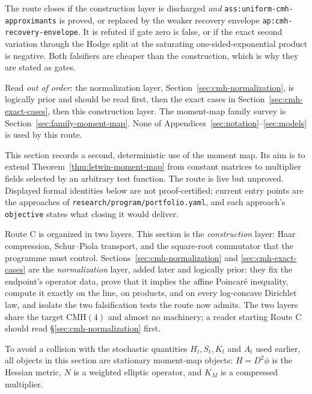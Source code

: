 \documentclass[../../main.tex]{subfiles}
\begin{document}
\begin{description}[leftmargin=0pt,style=nextline,itemsep=0.3em]
  \item[7. Completion or reopening criterion.] The route closes if the construction layer is
  discharged \emph{and} \texttt{ass:uniform-cmh-approximants} is proved, or replaced by the
  weaker recovery envelope \texttt{ap:cmh-recovery-envelope}. It is refuted if gate zero is
  false, or if the exact second variation through the Hodge split at the saturating
  one-sided-exponential product is negative. Both falsifiers are cheaper than the
  construction, which is why they are stated as gates.

  \item[8. Technical reading guide.] Read \emph{out of order}: the normalization layer,
  Section~\ref{sec:cmh-normalization}, is logically prior and should be read first, then the
  exact cases in Section~\ref{sec:cmh-exact-cases}, then this construction layer. The
  moment-map family survey is Section~\ref{sec:family-moment-map}. None of
  Appendices~\ref{sec:notation}--\ref{sec:models} is used by this route.
\end{description}

This section records a second, deterministic use of the moment map. Its aim is to extend
Theorem~\ref{thm:letwin-moment-map} from constant matrices to multiplier fields selected by an
arbitrary test function. The route is live but unproved. Displayed formal identities below are
not proof-certified; current entry points are the approaches of
\texttt{research/program/portfolio.yaml}, and each approach's \texttt{objective} states what
closing it would deliver.

Route C is organized in two layers. This section is the \emph{construction} layer: Haar
compression, Schur--Piola transport, and the square-root commutator that the programme must
control. Sections~\ref{sec:cmh-normalization} and \ref{sec:cmh-exact-cases} are the
\emph{normalization} layer, added later and logically prior: they fix the endpoint's operator
data, prove that it implies the affine Poincar\'e inequality, compute it exactly on the line, on
products, and on every log-concave Dirichlet law, and isolate the two falsification tests the
route now admits. The two layers share the target $\mathrm{CMH}(4)$ and almost no machinery; a
reader starting Route C should read \S\ref{sec:cmh-normalization} first.

To avoid a collision with the stochastic quantities $H_t,S_t,K_t$ and $A_t$ used earlier, all
objects in this section are stationary moment-map objects: $H=D^2\phi$ is the Hessian metric,
$N$ is a weighted elliptic operator, and $K_M$ is a compressed multiplier.
\end{document}
